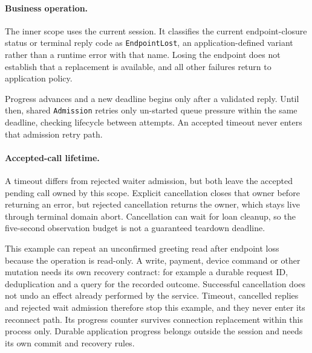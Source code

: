 

\paragraph*{Business operation.}
The inner scope uses the current session. It classifies the current
endpoint-closure status or terminal reply code as \texttt{EndpointLost}, an
application-defined variant rather than a runtime error with that name. Losing
the endpoint does not establish that a replacement is available, and all other
failures return to application policy.

Progress advances and a new deadline begins only after a validated reply. Until
then, shared \texttt{Admission} retries only un-started queue pressure within the
same deadline, checking lifecycle between attempts. An accepted timeout never
enters that admission retry path.



\begin{samepage}
\paragraph*{Accepted-call lifetime.}
A timeout differs from rejected waiter admission, but both leave the accepted
pending call owned by this scope. Explicit cancellation closes that owner before
returning an error, but rejected cancellation returns the owner, which stays live
through terminal domain abort. Cancellation can wait for loan cleanup, so the
five-second observation budget is not a guaranteed teardown deadline.\par
\end{samepage}



This example can repeat an unconfirmed greeting read after endpoint loss because
the operation is read-only. A write, payment, device command or other mutation
needs its own recovery contract: for example a durable request ID, deduplication
and a query for the recorded outcome. Successful cancellation does not undo an
effect already performed by the service. Timeout, cancelled replies and rejected
wait admission therefore stop this example, and they never enter its reconnect path.
Its progress counter survives connection replacement within this process only.
Durable application progress belongs outside the session and needs its own commit
and recovery rules.

